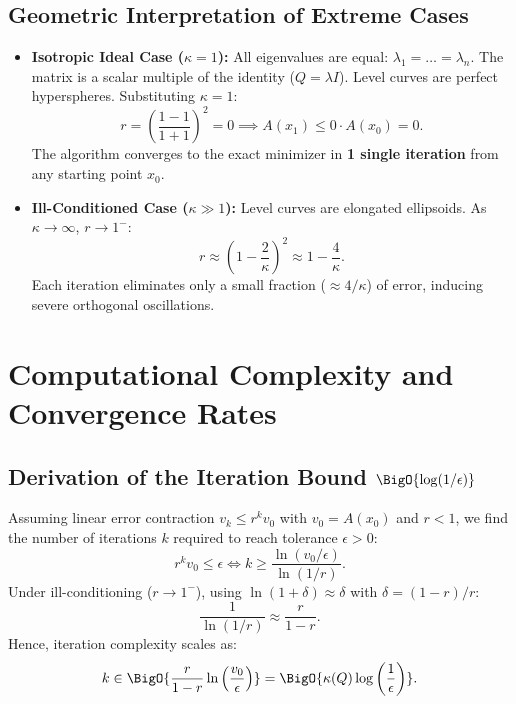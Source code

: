\subsection{Geometric Interpretation of Extreme Cases}
\begin{itemize}
    \item \textbf{Isotropic Ideal Case ($\kappa = 1$):}
    All eigenvalues are equal: $\lambda_1 = \dots = \lambda_n$. The matrix is a scalar multiple of the identity ($Q = \lambda I$). Level curves are perfect hyperspheres. Substituting $\kappa = 1$:
    \begin{equation}
        r = \left( \frac{1 - 1}{1 + 1} \right)^2 = 0 \implies A(x_1) \le 0 \cdot A(x_0) = 0.
    \end{equation}
    The algorithm converges to the exact minimizer in \textbf{1 single iteration} from any starting point $x_0$.
    \item \textbf{Ill-Conditioned Case ($\kappa \gg 1$):}
    Level curves are elongated ellipsoids. As $\kappa \to \infty$, $r \to 1^-$:
    \begin{equation}
        r \approx \left( 1 - \frac{2}{\kappa} \right)^2 \approx 1 - \frac{4}{\kappa}.
    \end{equation}
    Each iteration eliminates only a small fraction ($\approx 4/\kappa$) of error, inducing severe orthogonal oscillations.
\end{itemize}

\FloatBarrier
\section{Computational Complexity and Convergence Rates}
\label{sec:computational-complexity-convergence-rates}

\subsection[Derivation of the Iteration Bound O(log(1/epsilon))]{Derivation of the Iteration Bound $\BigO{\log(1/\epsilon)}$}
Assuming linear error contraction $v_k \le r^k v_0$ with $v_0 = A(x_0)$ and $r < 1$, we find the number of iterations $k$ required to reach tolerance $\epsilon > 0$:
\begin{equation}
    r^k v_0 \le \epsilon \iff k \ge \frac{\ln(v_0 / \epsilon)}{\ln(1/r)}.
\end{equation}
Under ill-conditioning ($r \to 1^-$), using $\ln(1 + \delta) \approx \delta$ with $\delta = (1-r)/r$:
\begin{equation}
    \frac{1}{\ln(1/r)} \approx \frac{r}{1 - r}.
\end{equation}
Hence, iteration complexity scales as:
\begin{equation}
    k \in \BigO{\frac{r}{1 - r} \ln\left( \frac{v_0}{\epsilon} \right)} = \BigO{\kappa(Q) \log\left( \frac{1}{\epsilon} \right)}.
\end{equation}

